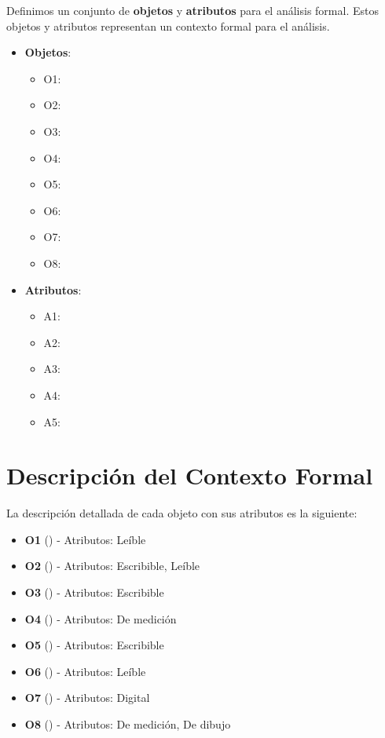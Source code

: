 Definimos un conjunto de \textbf{objetos} y \textbf{atributos} para el análisis formal. Estos objetos y atributos representan un contexto formal para el análisis.

\begin{itemize}
  \item \textbf{Objetos}:
  \begin{itemize}
      \item O1: 
      \item O2: 
      \item O3: 
      \item O4: 
      \item O5: 
      \item O6: 
      \item O7: 
      \item O8: 
  \end{itemize}
\end{itemize}

\begin{itemize}
  \item \textbf{Atributos}:
  \begin{itemize}
      \item A1: 
      \item A2: 
      \item A3: 
      \item A4: 
      \item A5: 
  \end{itemize}
\end{itemize}

\section{Descripción del Contexto Formal}

La descripción detallada de cada objeto con sus atributos es la siguiente:

\begin{itemize}
    \item \textbf{O1} () - Atributos: Leíble
    \item \textbf{O2} () - Atributos: Escribible, Leíble
    \item \textbf{O3} () - Atributos: Escribible
    \item \textbf{O4} () - Atributos: De medición
    \item \textbf{O5} () - Atributos: Escribible
    \item \textbf{O6} () - Atributos: Leíble
    \item \textbf{O7} () - Atributos: Digital
    \item \textbf{O8} () - Atributos: De medición, De dibujo
\end{itemize}

